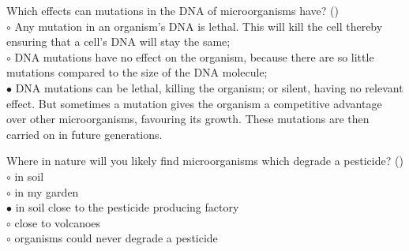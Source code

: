 \documentclass[]{beamer}
\begin{document}
\begin{frame}[shrink] {}
\addtocounter{answers}{1}
\color{blue}
Which effects can mutations in the DNA of microorganisms have? ()\\
\color{black}
\setlength{\parindent}{-0.4cm}
{\color{red}$\circ$} Any mutation in an organism's DNA is lethal. This will kill the cell
thereby ensuring that a cell’s DNA will stay the same;\\
{\color{red}$\circ$} DNA mutations have no effect on the organism, because there are
so little mutations compared to the size of the DNA molecule;\\
{\color{red}$\bullet$} DNA mutations can be lethal, killing the organism; or silent, having
no relevant effect. But sometimes a mutation gives the organism a
competitive advantage over other microorganisms, favouring its
growth. These mutations are then carried on in future generations.
\end{frame}

\begin{frame}[shrink] {}
\addtocounter{answers}{1}
\color{blue}
Where in nature will you likely find microorganisms which degrade a
pesticide? ()\\
\color{black}
\setlength{\parindent}{-0.4cm}
{\color{red}$\circ$} in soil\\
{\color{red}$\circ$} in my garden\\
{\color{red}$\bullet$} in soil close to the pesticide producing factory\\
{\color{red}$\circ$} close to volcanoes\\
{\color{red}$\circ$} organisms could never degrade a pesticide 
\end{frame}
\end{document}
